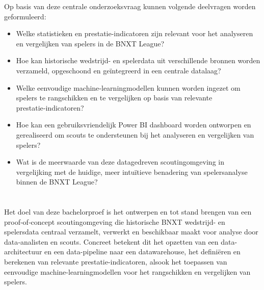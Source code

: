 Op basis van deze centrale onderzoeksvraag kunnen volgende deelvragen worden geformuleerd:
\begin{itemize}
    \item Welke statistieken en prestatie-indicatoren zijn relevant voor het analyseren en vergelijken van spelers in de BNXT League?
    \item Hoe kan historische wedstrijd- en spelerdata uit verschillende bronnen worden verzameld, opgeschoond en geïntegreerd in een centrale datalaag?
    \item Welke eenvoudige machine‑learningmodellen kunnen worden ingezet om spelers te rangschikken en te vergelijken op basis van relevante prestatie‑indicatoren?
    \item Hoe kan een gebruiksvriendelijk Power BI dashboard worden ontworpen en gerealiseerd om scouts te ondersteunen bij het analyseren en vergelijken van spelers?
    \item Wat is de meerwaarde van deze datagedreven scoutingomgeving in vergelijking met de huidige, meer intuïtieve benadering van spelersanalyse binnen de BNXT League?
\end{itemize} 
    
\section{}%
\label{sec:onderzoeksdoelstelling}

Het doel van deze bachelorproef is het ontwerpen en tot stand brengen van een proof‑of‑concept scoutingomgeving die historische BNXT wedstrijd- en spelersdata centraal verzamelt, verwerkt en beschikbaar maakt voor analyse door data‑analisten en scouts. Concreet betekent dit het opzetten van een data-architectuur en een data-pipeline naar een datawarehouse, het definiëren en berekenen van relevante prestatie-indicatoren, alsook het toepassen van eenvoudige machine-learningmodellen voor het rangschikken en vergelijken van spelers.
\section{}%
\label{sec:opzet-bachelorproef}


